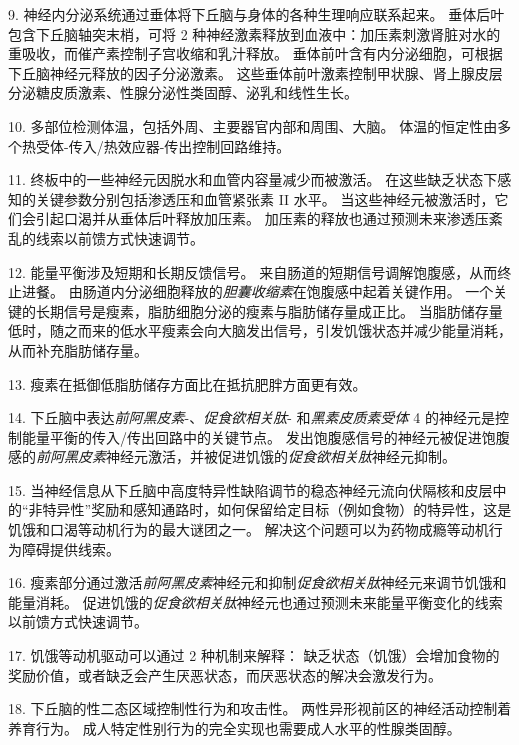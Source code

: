 9. 神经内分泌系统通过垂体将下丘脑与身体的各种生理响应联系起来。
垂体后叶包含下丘脑轴突末梢，可将 2 种神经激素释放到血液中：加压素刺激肾脏对水的重吸收，而催产素控制子宫收缩和乳汁释放。
垂体前叶含有内分泌细胞，可根据下丘脑神经元释放的因子分泌激素。
这些垂体前叶激素控制甲状腺、肾上腺皮层分泌糖皮质激素、性腺分泌性类固醇、泌乳和线性生长。


10. 多部位检测体温，包括外周、主要器官内部和周围、大脑。
体温的恒定性由多个热受体-传入/热效应器-传出控制回路维持。


11. 终板中的一些神经元因脱水和血管内容量减少而被激活。
在这些缺乏状态下感知的关键参数分别包括渗透压和血管紧张素 II 水平。
当这些神经元被激活时，它们会引起口渴并从垂体后叶释放加压素。
加压素的释放也通过预测未来渗透压紊乱的线索以前馈方式快速调节。 


12. 能量平衡涉及短期和长期反馈信号。
来自肠道的短期信号调解饱腹感，从而终止进餐。
由肠道内分泌细胞释放的\textit{胆囊收缩素}在饱腹感中起着关键作用。
一个关键的长期信号是瘦素，脂肪细胞分泌的瘦素与脂肪储存量成正比。
当脂肪储存量低时，随之而来的低水平瘦素会向大脑发出信号，引发饥饿状态并减少能量消耗，从而补充脂肪储存量。 


13. 瘦素在抵御低脂肪储存方面比在抵抗肥胖方面更有效。 


14. 下丘脑中表达\textit{前阿黑皮素}-、\textit{促食欲相关肽}- 和\textit{黑素皮质素受体} 4 的神经元是控制能量平衡的传入/传出回路中的关键节点。
发出饱腹感信号的神经元被促进饱腹感的\textit{前阿黑皮素}神经元激活，并被促进饥饿的\textit{促食欲相关肽}神经元抑制。


15. 当神经信息从下丘脑中高度特异性缺陷调节的稳态神经元流向伏隔核和皮层中的“非特异性”奖励和感知通路时，如何保留给定目标（例如食物）的特异性，这是饥饿和口渴等动机行为的最大谜团之一。
解决这个问题可以为药物成瘾等动机行为障碍提供线索。 


16. 瘦素部分通过激活\textit{前阿黑皮素}神经元和抑制\textit{促食欲相关肽}神经元来调节饥饿和能量消耗。
促进饥饿的\textit{促食欲相关肽}神经元也通过预测未来能量平衡变化的线索以前馈方式快速调节。


17. 饥饿等动机驱动可以通过 2 种机制来解释：
缺乏状态（饥饿）会增加食物的奖励价值，或者缺乏会产生厌恶状态，而厌恶状态的解决会激发行为。 


18. 下丘脑的性二态区域控制性行为和攻击性。
两性异形视前区的神经活动控制着养育行为。
成人特定性别行为的完全实现也需要成人水平的性腺类固醇。

